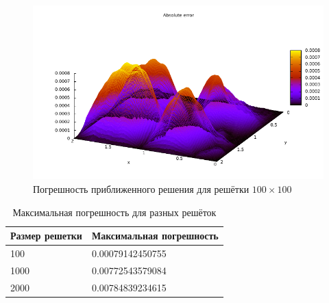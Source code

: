 \documentclass[12pt,notitlepage,oneside]{extarticle}
\begin{document}
\begin{figure}[h]
  \centering
  \includegraphics[scale=1.3]{abs_error.pdf}
  \caption{Погрешность приближенного решения для решётки $100 \times 100$}
  \label{err:image}
\end{figure}


\begin{table}[h]
  \centering
  \caption{Максимальная погрешность для разных решёток}
  \label{err:table}
  \begin{tabular}{|l|l|}
    \hline
    \textbf{Размер решетки}    & \textbf{Максимальная погрешность} \\ \hline
    100  & 0.00079142450755                  \\ \hline
    1000                       & 0.00772543579084                  \\ \hline
    2000 & 0.00784839234615                  \\ \hline
  \end{tabular}
\end{table}
\end{document}
